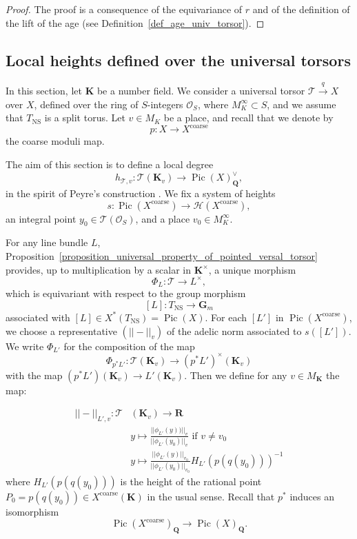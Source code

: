 \documentclass{proc-l}
\newcommand{\R}{\mathbf{R}}
\newcommand{\K}{\mathbf{K}}
\newcommand{\Q}{\mathbf{Q}}
\newcommand{\G}{\mathbf{G}}
\DeclareMathOperator{\Pic}{Pic}
\DeclareMathOperator{\NS}{NS}
\DeclareMathOperator{\coarse}{coarse}
\newcommand{\stackT}{\mathcal{T}}
\newcommand{\sheafO}{\mathcal{O}}
\theoremstyle{definition}
\theoremstyle{remark}
\numberwithin{equation}{section}
\begin{document}
\begin{proof}
    The proof is a consequence of the equivariance of $r$ and of the definition of the
lift of the age (see Definition~\ref{def_age_univ_torsor}).
\end{proof}




\subsection{Local heights defined over the universal torsors}\label{subsection_local_height_coarse}




In this section, let $\K$ be a number field. We consider a universal torsor
$\stackT \xrightarrow{q} X$ over $X$, defined over the ring of $S$-integers
$\sheafO_S$, where $M_{K}^{\infty} \subset S$, and we assume that $T_{\NS}$ is a split torus. Let $v \in M_K$ be a
place, and recall that we denote by
\[
p : X \longrightarrow X^{\coarse}
\]
the coarse moduli map.

The aim of this section is to define a local degree
\[
h_{\stackT,v} : \stackT(\K_v) \longrightarrow \Pic(X)^{\vee}_{\Q},
\]
in the spirit of Peyre’s construction
\cite[Construction~4.27]{Peyre_beyond_height}. We fix a system of heights
\[
s : \Pic(X^{\coarse}) \longrightarrow \mathcal{H}(X^{\coarse}),
\]
an integral point $y_0 \in \stackT(\sheafO_S)$, and a place
$v_0 \in M^{\infty}_K$.

For any line bundle $L$, Proposition~\ref{proposition_universal_property_of_pointed_versal_torsor}
provides, up to multiplication by a scalar in $\K^{\times}$, a unique morphism
\[
\Phi_L : \stackT \longrightarrow L^{\times},
\]
which is equivariant with respect to the group morphism
\[
[L] : T_{\NS} \longrightarrow \G_m
\]
associated with $[L] \in X^{*}(T_{\NS}) = \Pic(X)$. For each $[L']$ in $\Pic(X^{\coarse})$, we choose a representative $(||-||_v)$ of the adelic norm associated to $s([L'])$. We write $\Phi_{L'}$ for the composition of the map $$\Phi_{p^* L'} : \stackT(\K_v) \rightarrow (p^* L')^{\times}(\K_v)$$with the map $\left( p^*L' \right)(\K_v) \rightarrow L'(\K_v)$. Then we define for any $v \in M_{\K}$ the map:

\begin{align*}
    ||-||_{L',v} : \stackT&(\K_v) \rightarrow \R \\
    &y \longmapsto \frac{||\phi_{L'}(y))||_v}{||\phi_{L'}(y_0)||_v} \text{  if } v \neq v_0 \\
    &y \longmapsto \frac{||\phi_{L'}(y)||_{v_0}}{||\phi_{L'}(y_0)||_{v_0}} H_{L'}\left(p(q(y_0))\right)^{-1}
\end{align*}where $H_{L'}\left(p(q(y_0))\right)$ is the height of the rational point $P_0 = p(q(y_0)) \in X^{\coarse}(\K) $ in the usual sense. Recall that $p^*$ induces an isomorphism $$\Pic(X^{\coarse})_{\Q} \rightarrow \Pic(X)_{\Q} .$$
\end{document}
